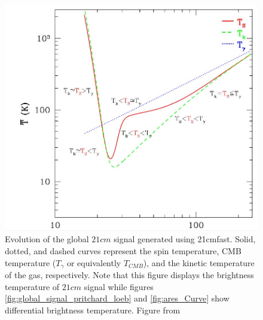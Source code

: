 \documentclass[12pt, TexShade, letterpaper]{report}
\begin{document}
\begin{figure}[h!]
    \centering
    \includegraphics[scale = 0.6]{21cm_curve.jpg}
    \caption[Evolution of the global $21cm$ signal generated using \gls{21cmfast}]{Evolution of the  global $21cm$ signal generated using \gls{21cmfast}. Solid, dotted, and dashed curves represent the spin temperature, CMB temperature ($T_\gamma$ or equivalently $T_{CMB}$), and the kinetic temperature of the gas, respectively. Note that this figure displays the brightness temperature of $21cm$ signal while figures \ref{fig:global_signal_pritchard_loeb} and \ref{fig:ares_Curve} show differential brightness temperature. Figure from \cite{21cmfast_python}}
    \label{fig:21cmfast_curve}
\end{figure}
\end{document}
